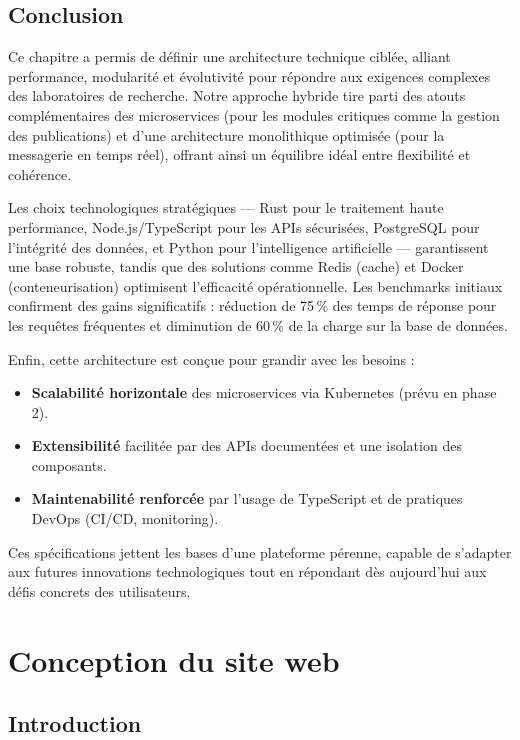 \documentclass[12pt]{rapportPfe}
\begin{document}
\section{Conclusion}
Ce chapitre a permis de définir une architecture technique ciblée, alliant performance, modularité et évolutivité pour répondre aux exigences complexes des laboratoires de recherche. Notre approche hybride tire parti des atouts complémentaires des microservices (pour les modules critiques comme la gestion des publications) et d'une architecture monolithique optimisée (pour la messagerie en temps réel), offrant ainsi un équilibre idéal entre flexibilité et cohérence.

Les choix technologiques stratégiques — Rust pour le traitement haute performance, Node.js/TypeScript pour les APIs sécurisées, PostgreSQL pour l’intégrité des données, et Python pour l’intelligence artificielle — garantissent une base robuste, tandis que des solutions comme Redis (cache) et Docker (conteneurisation) optimisent l’efficacité opérationnelle. Les benchmarks initiaux confirment des gains significatifs : réduction de 75\,\% des temps de réponse pour les requêtes fréquentes et diminution de 60\,\% de la charge sur la base de données.

Enfin, cette architecture est conçue pour grandir avec les besoins :

\begin{itemize}
    \item \textbf{Scalabilité horizontale} des microservices via Kubernetes (prévu en phase 2).
    \item \textbf{Extensibilité} facilitée par des APIs documentées et une isolation des composants.
    \item \textbf{Maintenabilité renforcée} par l’usage de TypeScript et de pratiques DevOps (CI/CD, monitoring).
\end{itemize}

Ces spécifications jettent les bases d’une plateforme pérenne, capable de s’adapter aux futures innovations technologiques tout en répondant dès aujourd’hui aux défis concrets des utilisateurs.

\chapter{Conception du site web}

\section{Introduction}
\end{document}
